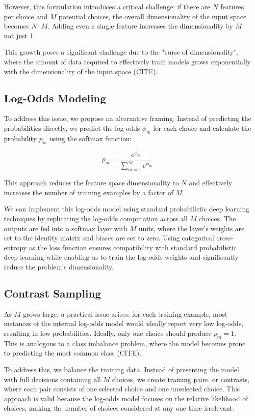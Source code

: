 \documentclass[11pt]{article}
\begin{document}
However, this formulation introduces a critical challenge: if there are $N$ features per choice and $M$ potential choices, the overall dimensionality of the input space becomes $N \cdot M$. Adding even a single feature increases the dimensionality by $M$ not just 1.

This growth poses a significant challenge due to the "curse of dimensionality", where the amount of data required to effectively train models grows exponentially with the dimensionality of the input space (CITE).

\subsection*{Log-Odds Modeling}

To address this issue, we propose an alternative framing. Instead of predicting the probabilities directly, we predict the log-odds $\phi_m$ for each choice and calculate the probability $p_m$ using the softmax function:

$$p_m = \frac{e^{\phi_m}}{\sum_{m=1}^{M}e^{\phi_m}}$$

This approach reduces the feature space dimensionality to $N$ and effectively increases the number of training examples by a factor of $M$.

We can implement this log-odds model using standard probabilistic deep learning techniques by replicating the log-odds computation across all $M$ choices. The outputs are fed into a softmax layer with $M$ units, where the layer's weights are set to the identity matrix and biases are set to zero. Using categorical cross-entropy as the loss function ensures compatibility with standard probabilistic deep learning while enabling us to train the log-odds weights and significantly reduce the problem's dimensionality.

\subsection*{Contrast Sampling}

As $M$ grows large, a practical issue arises: for each training example, most instances of the internal log-odds model would ideally report very low log-odds, resulting in low probabilities. Ideally, only one choice should produce $p_m=1$. This is analogous to a class imbalance problem, where the model becomes prone to predicting the most common class (CITE).

To address this, we balance the training data. Instead of presenting the model with full decisions containing all $M$ choices, we create training pairs, or contrasts, where each pair consists of one selected choice and one unselected choice. This approach is valid because the log-odds model focuses on the relative likelihood of choices, making the number of choices considered at any one time irrelevant.
\end{document}
